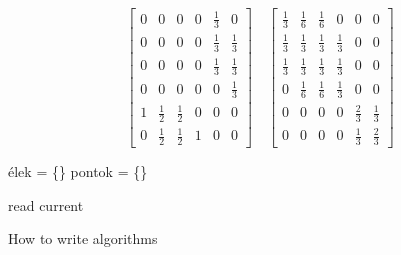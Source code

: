   \[ 
  \begin{bmatrix}
  0 & 0 & 0 & 0 & \frac{1}{3} & 0 \\[6pt]
  0 & 0 & 0 & 0 & \frac{1}{3} & \frac{1}{3}\\[6pt] 
  0 & 0 & 0 & 0 & \frac{1}{3} & \frac{1}{3}\\[6pt] 
  0 & 0 & 0 & 0 & 0 & \frac{1}{3}\\[6pt] 
  1 & \frac{1}{2} & \frac{1}{2} & 0 & 0 & 0\\[6pt] 
  0 & \frac{1}{2} & \frac{1}{2} & 1 & 0 & 0
  \end{bmatrix}
  \quad
  \begin{bmatrix}
  \frac{1}{3} & \frac{1}{6} & \frac{1}{6} & 0 & 0 & 0 \\[6pt] 
  \frac{1}{3} & \frac{1}{3} & \frac{1}{3} & \frac{1}{3} & 0 & 0\\[6pt] 
  \frac{1}{3} & \frac{1}{3} & \frac{1}{3} & \frac{1}{3} & 0 & 0\\[6pt] 
  0 & \frac{1}{6} & \frac{1}{6} & \frac{1}{3} & 0 & 0\\[6pt] 
  0 & 0 & 0 & 0 & \frac{2}{3} & \frac{1}{3}\\[6pt] 
  0 & 0 & 0 & 0 & \frac{1}{3} & \frac{2}{3}
  \end{bmatrix}
  \]
  
  
  		\begin{algorithm}[H]
  		élek = \{\}\;
  		pontok = \{\}\;
  		
  				read current\;
  		
  		\caption{How to write algorithms}
  		\end{algorithm}